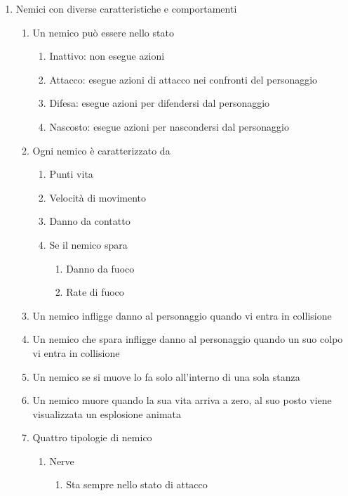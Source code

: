 \begin{enumerate}
    \item Nemici con diverse caratteristiche e comportamenti
    \begin{enumerate}
        \item Un nemico può essere nello stato
        \begin{enumerate}
            \item Inattivo: non esegue azioni
            \item Attacco: esegue azioni di attacco nei confronti del personaggio
            \item Difesa: esegue azioni per difendersi dal personaggio
            \item Nascosto: esegue azioni per nascondersi dal personaggio
        \end{enumerate}
        \item Ogni nemico è caratterizzato da
            \begin{enumerate}
                \item Punti vita
                \item Velocità di movimento
                \item Danno da contatto
                \item Se il nemico spara
                \begin{enumerate}
                    \item Danno da fuoco
                    \item Rate di fuoco
                \end{enumerate}
            \end{enumerate}
        \item Un nemico infligge danno al personaggio quando vi entra in collisione
        \item Un nemico che spara infligge danno al personaggio quando un suo colpo vi entra in collisione
        \item Un nemico se si muove lo fa solo all'interno di una sola stanza
        \item Un nemico muore quando la sua vita arriva a zero, al suo posto viene visualizzata un esplosione animata
        \item Quattro tipologie di nemico
            \begin{enumerate}
                \item Nerve
                    \begin{enumerate}
                        \item Sta sempre nello stato di attacco

\end{enumerate}
\end{enumerate}
\end{enumerate}
\end{enumerate}
